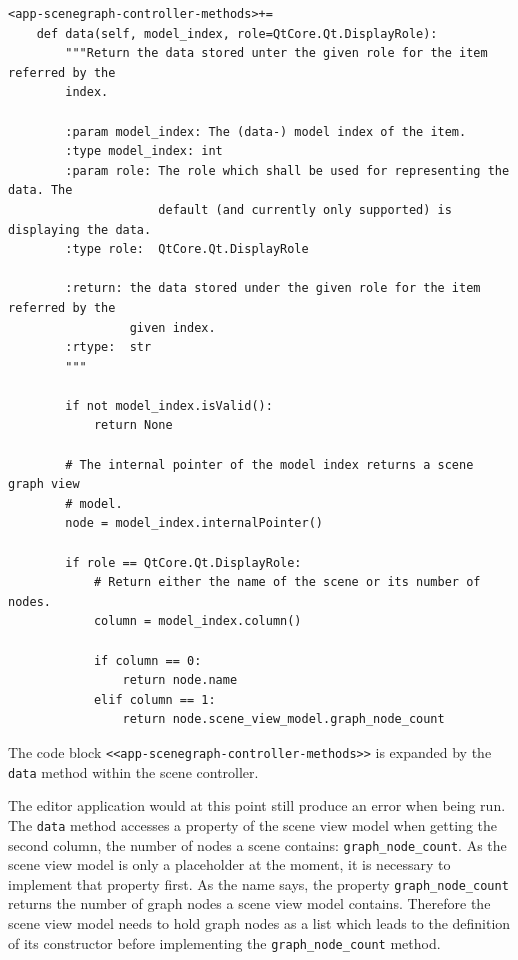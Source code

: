 \documentclass[10pt, openright, notitlepage]{scrreprt}
\begin{document}
\begin{listing}[H]
\begin{verbatim}
<app-scenegraph-controller-methods>+=
    def data(self, model_index, role=QtCore.Qt.DisplayRole):
        """Return the data stored unter the given role for the item referred by the
        index.
    
        :param model_index: The (data-) model index of the item.
        :type model_index: int
        :param role: The role which shall be used for representing the data. The
                     default (and currently only supported) is displaying the data.
        :type role:  QtCore.Qt.DisplayRole
    
        :return: the data stored under the given role for the item referred by the
                 given index.
        :rtype:  str
        """
    
        if not model_index.isValid():
            return None
    
        # The internal pointer of the model index returns a scene graph view
        # model.
        node = model_index.internalPointer()
    
        if role == QtCore.Qt.DisplayRole:
            # Return either the name of the scene or its number of nodes.
            column = model_index.column()
    
            if column == 0:
                return node.name
            elif column == 1:
                return node.scene_view_model.graph_node_count
\end{verbatim}
\caption{\label{lst:app-scenegraph-controller-methods-04}
The code block \texttt{<<app-scenegraph-controller-methods>>} is expanded by the \texttt{data} method within the scene controller.}
\end{listing}

The editor application would at this point still produce an error when being
run. The \texttt{data} method accesses a property of the scene view model
when getting the second column, the number of nodes a scene contains:
\texttt{graph\_node\_count}. As the scene view model is only a placeholder at the
moment, it is necessary to implement that property first. As the name says, the
property \texttt{graph\_node\_count} returns the number of graph nodes a scene view
model contains. Therefore the scene view model needs to hold graph nodes as a
list which leads to the definition of its constructor before implementing the
\texttt{graph\_node\_count} method.
\end{document}
